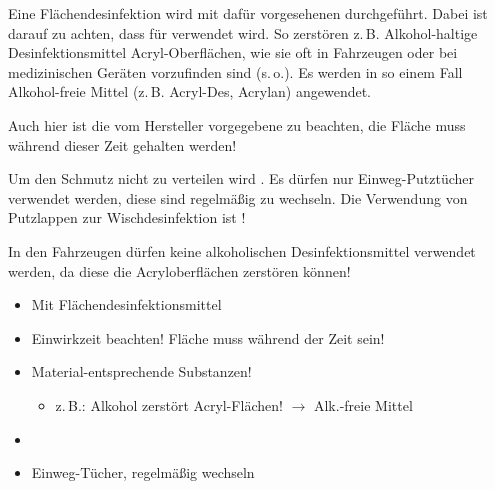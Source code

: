 {%
Eine Flächendesinfektion wird mit dafür vorgesehenen
 durchgeführt. Dabei ist
darauf zu achten, dass für  verwendet wird. So zerstören z.\,B.
Alkohol-haltige Desinfektionsmittel Acryl-Oberflächen, wie
sie oft in Fahrzeugen oder bei medizinischen Geräten
vorzufinden sind (s.\,o.). Es werden in so einem Fall
Alkohol-freie Mittel (z.\,B. Acryl-Des{\texttrademark},
Acrylan{\texttrademark}) angewendet.

Auch hier ist die vom Hersteller vorgegebene
 zu beachten, die Fläche muss während dieser
Zeit  gehalten werden!

Um den Schmutz nicht zu verteilen wird . Es dürfen nur
Einweg-Putztücher verwendet werden, diese sind regelmäßig zu
wechseln. Die Verwendung von Putzlappen zur
Wischdesinfektion ist !

\begin{Danger}
  \item In den Fahrzeugen dürfen keine alkoholischen
  Desinfektionsmittel verwendet werden, da diese die
  Acryloberflächen zerstören können!
\end{Danger}
}{
\begin{itemize}
  \item Mit Flächendesinfektionsmittel
  \item Einwirkzeit beachten! Fläche muss während der Zeit
   sein!
  \item Material-entsprechende Substanzen!
  \begin{itemize}
    \item z.\,B.: Alkohol zerstört Acryl-Flächen! ${\rightarrow}$
    Alk.-freie Mittel
  \end{itemize}
  \item {}
  \item Einweg-Tücher, regelmäßig wechseln
\end{itemize}
}{}{}{}

